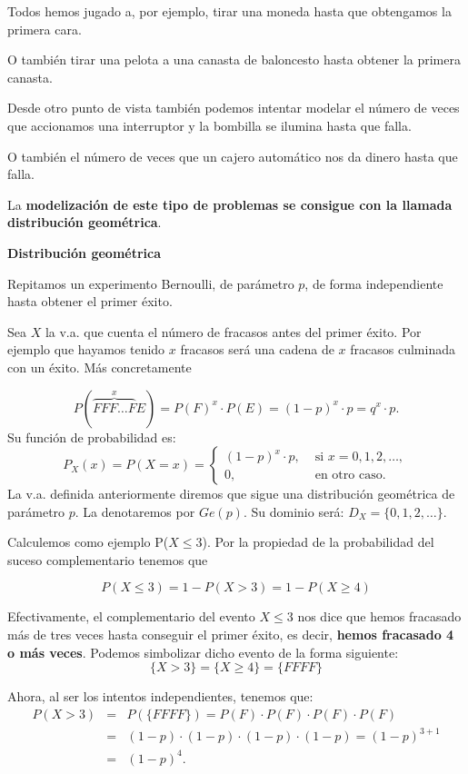 \documentclass[]{book}
\begin{document}
Todos hemos jugado a, por ejemplo, tirar una moneda hasta que obtengamos la primera cara.

O también tirar una pelota a una canasta de baloncesto hasta obtener la primera canasta.

Desde otro punto de vista también podemos intentar modelar el número de veces que accionamos una interruptor y la bombilla se ilumina hasta que falla.

O también el número de veces que un cajero automático nos da dinero hasta que falla.

La \textbf{modelización de este tipo de problemas se consigue con la llamada distribución geométrica}.

 \textbf{Distribución geométrica}

Repitamos un experimento Bernoulli, de parámetro \(p\), de forma independiente hasta obtener el primer éxito.

Sea \(X\) la v.a. que cuenta el número de fracasos antes del primer éxito. Por ejemplo que hayamos tenido \(x\) fracasos será una cadena de \(x\) fracasos culminada con un éxito. Más concretamente

\[P(\overbrace{FFF\ldots F}^{x}E)=P(F)^{x}\cdot P(E)=(1-p)^{x}\cdot p=q^{x}\cdot p.\]
Su función de probabilidad es:
\[
P_X(x)=P(X=x)=\left\{\begin{array}{ll}
(1-p)^{x}\cdot p, & \mbox{ si } x=0,1,2,\ldots,\\
0, &\mbox{ en otro caso.}
\end{array}\right.
\]
La v.a. definida anteriormente diremos que sigue una distribución geométrica de parámetro \(p\). La denotaremos por \(Ge(p)\).
Su dominio será: \(D_X=\{0,1,2,\ldots\}\).

Calculemos como ejemplo P(\(X\leq 3\)).
Por la propiedad de la probabilidad del suceso complementario tenemos que

\[
P(X\leq 3 )=1-P(X> 3)=1-P(X\geq 4)
\]

Efectivamente, el complementario del evento \(X\leq 3\) nos dice que hemos fracasado más de tres veces hasta conseguir el primer éxito, es decir, \textbf{hemos fracasado 4 o más veces}. Podemos simbolizar dicho evento de la forma siguiente:
\[
\{X>3\}=\{X\geq 4\}= \{FFFF\}
\]

Ahora, al ser los intentos independientes, tenemos que:
\begin{eqnarray*}
P(X>3) & = & P(\{FFFF\})= P(F)\cdot P(F)\cdot P(F)\cdot P(F)\\
&=& (1-p)\cdot (1-p)\cdot (1-p)\cdot (1-p)= (1-p)^{3+1}\\\
&=&(1-p)^{4}.
\end{eqnarray*}
\end{document}
